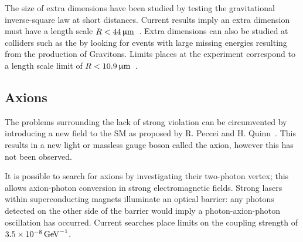 The size of extra dimensions have been studied by testing the gravitational inverse-square law at short distances. Current results imply an extra dimension must have a length scale $R < 44 {\,\upmu\mathrm{m}}$~\cite{Kapner:2006si}.
Extra dimensions can also be studied at colliders such as the \lhc by looking for events with large missing energies resulting from the production of Gravitons. Limits places at the \atlas experiment correspond to a length scale limit of $R < 10.9 {\,\upmu\mathrm{m}}$~\cite{Aaboud:2016tnv}.    

\subsection{Axions}
The problems surrounding the lack of strong \CP violation can be circumvented by introducing a new field to the SM as proposed by R. Peccei and H. Quinn~\cite{PhysRevLett.38.1440}. This results in a new light or massless gauge boson called the axion, however this has not been observed.     

It is possible to search for axions by investigating their two-photon vertex; this allows axion-photon conversion in strong electromagnetic fields. Strong lasers within superconducting magnets illuminate an optical barrier: any photons detected on the other side of the barrier would imply a photon-axion-photon oscillation has occurred. Current searches place limits on the coupling strength of $3.5\times10^{-8} \mathrm{\,Ge\kern -0.1em V}^{-1}$\cite{Ballou:2015cka}.  



